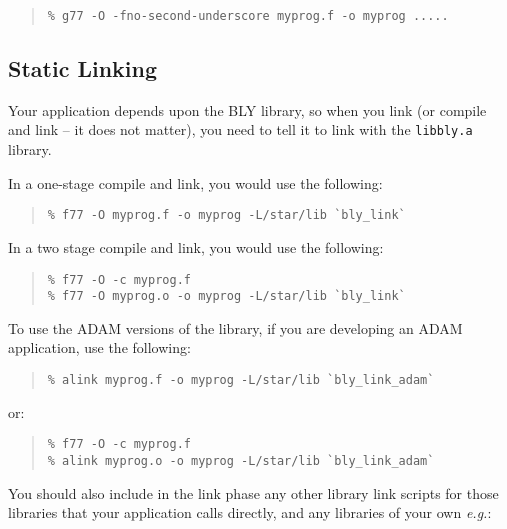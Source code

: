 \documentclass[twoside,11pt]{article}
\newcommand{\xlabel}[1]{}
\begin{document}
\begin{quote}
\begin{verbatim}
% g77 -O -fno-second-underscore myprog.f -o myprog .....
\end{verbatim}
\end{quote}

\subsection{\xlabel{static_linking}Static Linking}
\label{static_linking}

Your application depends upon the BLY library, so when you link (or
compile and link -- it does not matter), you need to tell it to link with
the \texttt{libbly.a} library.

In a one-stage compile and link, you would use the following:

\begin{quote}
\begin{verbatim}
% f77 -O myprog.f -o myprog -L/star/lib `bly_link`
\end{verbatim}
\end{quote}

In a two stage compile and link, you would use the following:

\begin{quote}
\begin{verbatim}
% f77 -O -c myprog.f
% f77 -O myprog.o -o myprog -L/star/lib `bly_link`
\end{verbatim}
\end{quote}

To use the ADAM versions of the library, if you are developing an ADAM
application, use the following:

\begin{quote}
\begin{verbatim}
% alink myprog.f -o myprog -L/star/lib `bly_link_adam`
\end{verbatim}
\end{quote}
or:
\begin{quote}
\begin{verbatim}
% f77 -O -c myprog.f
% alink myprog.o -o myprog -L/star/lib `bly_link_adam`
\end{verbatim}
\end{quote}

You should also include in the link phase any other library link scripts
for those libraries that your application calls directly, and any
libraries of your own \emph{e.g.}:
\end{document}
